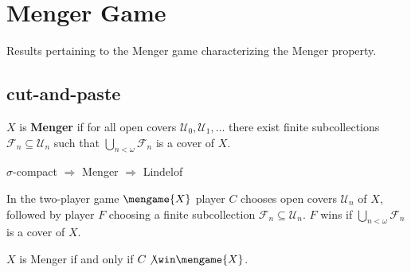 
\chapter{Menger Game}

Results pertaining to the Menger game characterizing the Menger property.

\section{cut-and-paste}


  \begin{defn}
    $X$ is \textbf{Menger} if for all open covers $\mathcal{U}_0,\mathcal{U}_1,\dots$ there exist finite subcollections $\mathcal{F}_n \subseteq \mathcal{U}_n$ such that $\bigcup_{n<\omega} \mathcal{F}_n$ is a cover of $X$.
  \end{defn}

  \begin{prop}
    $\sigma$-compact $\Rightarrow$ Menger $\Rightarrow$ Lindelof
  \end{prop}

  \begin{defn}
    In the two-player game $\mengame{X}$ player $C$ chooses open covers $\mathcal{U}_n$ of $X$, followed by player $F$ choosing a finite subcollection $\mathcal{F}_n\subseteq\mathcal{U}_n$. $F$ wins if $\bigcup_{n<\omega} \mathcal{F}_n$ is a cover of $X$.
  \end{defn}

  \begin{thm}
    $X$ is Menger if and only if $C \not\win \mengame{X}$.
  \end{thm}

